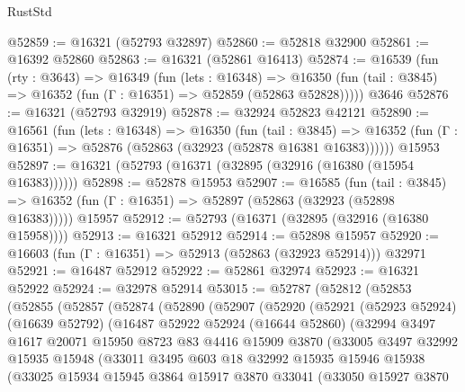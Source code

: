\begin{lexlean}{RustStd}
\begin{coremodule}
@52859 := @16321 (@52793 @32897)
@52860 := @52818 @32900
@52861 := @16392 @52860
@52863 := @16321 (@52861 @16413)
@52874 := @16539
    (fun (rty : @3643) =>
    @16349
      (fun (lets : @16348) =>
      @16350 (fun (tail : @3845) => @16352 (fun (Γ : @16351) => @52859 (@52863 @52828)))))
    @3646
@52876 := @16321 (@52793 @32919)
@52878 := @32924 @52823 @42121
@52890 := @16561
    (fun (lets : @16348) =>
    @16350
      (fun (tail : @3845) =>
      @16352 (fun (Γ : @16351) => @52876 (@52863 (@32923 (@52878 @16381 @16383))))))
    @15953
@52897 := @16321 (@52793 (@16371 (@32895 (@32916 (@16380 (@15954 @16383))))))
@52898 := @52878 @15953
@52907 := @16585
    (fun (tail : @3845) => @16352 (fun (Γ : @16351) => @52897 (@52863 (@32923 (@52898 @16383)))))
    @15957
@52912 := @52793 (@16371 (@32895 (@32916 (@16380 @15958))))
@52913 := @16321 @52912
@52914 := @52898 @15957
@52920 := @16603 (fun (Γ : @16351) => @52913 (@52863 (@32923 @52914))) @32971
@52921 := @16487 @52912
@52922 := @52861 @32974
@52923 := @16321 @52922
@52924 := @32978 @52914
@53015 := @52787
    (@52812
      (@52853
        (@52855
          (@52857
            (@52874
              (@52890
                (@52907
                  (@52920
                    (@52921
                      (@52923 @52924)
                      (@16639 @52792)
                      (@16487
                        @52922
                        @52924
                        (@16644 @52860)
                        (@32994
                          @3497
                          @1617
                          @20071
                          @15950
                          @8723
                          @83
                          @4416
                          @15909
                          @3870
                          (@33005
                            @3497
                            @32992
                            @15935
                            @15948
                            (@33011
                              @3495
                              @603
                              @18
                              @32992
                              @15935
                              @15946
                              @15938
                              (@33025
                                @15934
                                @15945
                                @3864
                                @15917
                                @3870
                                @33041
                                (@33050
                                  @15927
                                  @3870

\end{coremodule}
\end{lexlean}
